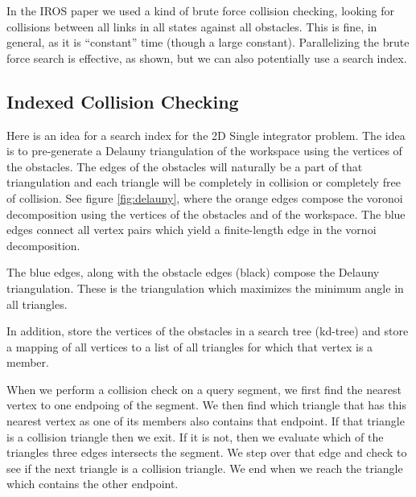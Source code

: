 In the IROS paper we used a kind of brute force collision checking, looking for collisions between all links in all states against all obstacles. This is fine, in general, as it is ``constant'' time (though a large constant). Parallelizing the brute force search is effective, as shown, but we can also potentially use a search index. 


\subsection{Indexed Collision Checking}

Here is an idea for a search index for the 2D Single integrator problem. The idea is to pre-generate a Delauny triangulation of the workspace using the vertices of the obstacles. The edges of the obstacles will naturally be a part of that triangulation and each triangle will be completely in collision or completely free of collision. See figure \ref{fig:delauny}, where the orange edges compose the voronoi decomposition using the vertices of the obstacles and of the workspace. The blue edges connect all vertex pairs which yield a finite-length edge in the vornoi decomposition.  

\begin{figure}[H]
\begin{centering}
    \texttt{[image: \\figfile\{fig/delauny\_collision]}}
    \caption{Delauny Triangulation}
    \label{fig:delauny}
\end{centering} 
\end{figure}

The blue edges, along with the obstacle edges (black) compose the Delauny triangulation. These is the triangulation which maximizes the minimum angle in all triangles. 

In addition, store the vertices of the obstacles in a search tree (kd-tree) and store a mapping of all vertices to a list of all triangles for which that vertex is a member. 

When we perform a collision check on a query segment, we first find the nearest vertex to one endpoing of the segment. We then find which triangle that has this nearest vertex as one of its members also contains that endpoint. If that triangle is a collision triangle then we exit. If it is not, then we evaluate which of the triangles three edges intersects the segment. We step over that edge and check to see if the next triangle is a collision triangle. We end when we reach the triangle which contains the other endpoint. 

